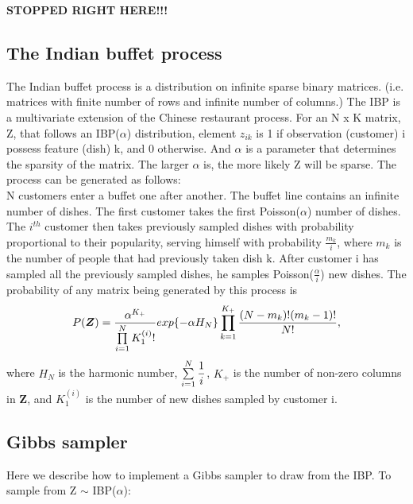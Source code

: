 \noindent






\noindent
\textbf{STOPPED RIGHT HERE!!!}



\subsection{The Indian buffet process}
The Indian buffet process is a distribution on infinite sparse binary matrices.
(i.e. matrices with finite number of rows and infinite number of columns.) The
IBP is a multivariate extension of the Chinese restaurant process. For an N x K
matrix, Z, that follows an IBP($\alpha$) distribution, element $z_{ik}$ is 1 if
observation (customer) i possess feature (dish) k, and 0 otherwise.  And
$\alpha$ is a parameter that determines the sparsity of the matrix. The larger
$\alpha$ is, the more likely Z will be sparse. The process can be generated as
follows: \\

\noindent
N customers enter a buffet one after another. The buffet line contains an
infinite number of dishes. The first customer takes the first Poisson($\alpha$)
number of dishes. The $i^{th}$ customer then takes previously sampled dishes
with probability proportional to their popularity, serving himself with
probability $\frac{m_k}{i}$, where $m_k$ is the number of people that had
previously taken dish k. After customer i has sampled all the previously sampled
dishes, he samples Poisson($\frac{\alpha}{i}$) new dishes. The probability of 
any matrix being generated by this process is
\begin{equation}
  P(\bm{Z}) = \frac{\alpha^{K_+}}{\prod\limits_{i=1}^{N} K_1^{(i)}!} 
              exp\{-\alpha H_N\}\prod\limits_{k=1}^{K_+}
              \frac{(N-m_k)!(m_k-1)!}{N!},
\end{equation}
where $H_N$ is the harmonic number, $\sum\limits_{i=1}^{N}\displaystyle\frac{1}{i}$, $K_+$ is the 
number of non-zero columns in $\bm Z$, and $K_1^{(i)}$ is the number of new dishes
sampled by customer i. %

\subsection{Gibbs sampler}
Here we describe how to implement a Gibbs sampler to draw from the IBP. 
To sample from Z $\sim$ IBP($\alpha$):

